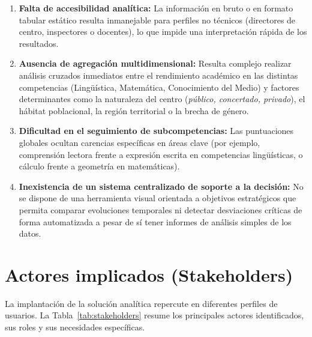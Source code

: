 \documentclass[12pt, a4paper, twoside]{report}
\begin{document}
\begin{enumerate}
    \item \textbf{Falta de accesibilidad analítica:} La información en bruto o en formato tabular estático resulta inmanejable para perfiles no técnicos (directores de centro, inspectores o docentes), lo que impide una interpretación rápida de los resultados.
    \item \textbf{Ausencia de agregación multidimensional:} Resulta complejo realizar análisis cruzados inmediatos entre el rendimiento académico en las distintas competencias (Lingüística, Matemática, Conocimiento del Medio) y factores determinantes como la naturaleza del centro (\textit{público, concertado, privado}), el hábitat poblacional, la región territorial o la brecha de género.
    \item \textbf{Dificultad en el seguimiento de subcompetencias:} Las puntuaciones globales ocultan carencias específicas en áreas clave (por ejemplo, comprensión lectora frente a expresión escrita en competencias lingüísticas, o cálculo frente a geometría en matemáticas).
    \item \textbf{Inexistencia de un sistema centralizado de soporte a la decisión:} No se dispone de una herramienta visual orientada a objetivos estratégicos que permita comparar evoluciones temporales ni detectar desviaciones críticas de forma automatizada a pesar de sí tener informes de análisis simples de los datos.
\end{enumerate}

\section{Actores implicados (Stakeholders)}
La implantación de la solución analítica repercute en diferentes perfiles de usuarios. La Tabla~\ref{tab:stakeholders} resume los principales actores identificados, sus roles y sus necesidades específicas.
\end{document}
